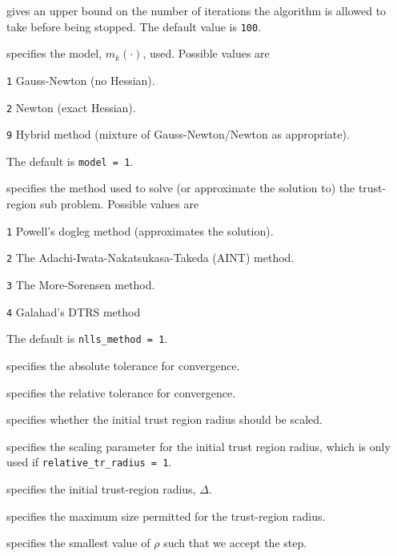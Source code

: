 \documentclass{spec}
\begin{document}
\begin{description}

 gives an upper bound on the number
of iterations the algorithm is allowed to take before being stopped.  The default value is {\tt 100}.

 specifies the model, $m_k(\cdot)$, used.  Possible values are 
\begin{description}
  \item{\tt 1} Gauss-Newton (no Hessian).
  \item{\tt 2} Newton (exact Hessian).
  \item{\tt 9} Hybrid method (mixture of Gauss-Newton/Newton as appropriate).
\end{description}
The default is {\tt model = 1}.

 specifies the method used to solve 
(or approximate the solution to) the trust-region sub problem.  Possible values are
\begin{description}
  \item{\tt 1} Powell's dogleg method (approximates the solution).
  \item{\tt 2} The Adachi-Iwata-Nakatsukasa-Takeda (AINT) method.
  \item{\tt 3} The More-Sorensen method.
  \item{\tt 4} Galahad's DTRS method
\end{description}
The default is {\tt nlls\_method = 1}.

 specifies the absolute tolerance for convergence.

 specifies the relative tolerance for convergence.

 specifies whether the initial trust region 
radius should be scaled.

 specifies the scaling parameter for the initial trust region radius, which is only used if {\tt relative\_tr\_radius = 1}.

 specifies the initial trust-region radius, $\Delta$.

 specifies the maximum size permitted for the trust-region radius.

 specifies the smallest value of $\rho$ such that we accept the step.  


\end{description}
\end{document}
